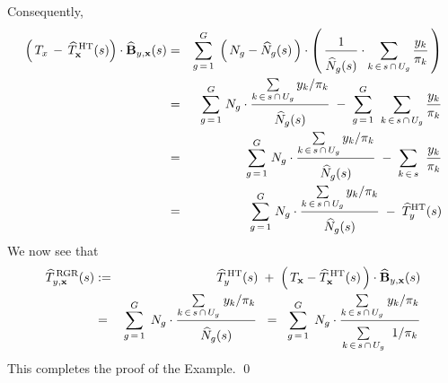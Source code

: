 Consequently,
\begin{eqnarray*}
\left(\,T_{x} \,-\, \widehat{T}^{\,\textnormal{HT}}_{\mathbf{x}}(s)\right)
\cdot
\widehat{\mathbf{B}}_{y,\mathbf{x}}(s)
& = &
	\overset{G}{\underset{g\,=\,1}{\sum}}\;
	\left(\,N_{g} - \widehat{N}_{g}(s) \,\right)
	\cdot
	\left(\,
		\dfrac{1}{\overset{{\color{white}.}}{\widehat{N}_{g}(s)}}
		\cdot
		\underset{k\,\in\,s\,\cap\,U_{g}}{\sum}\, \dfrac{y_{k}}{\pi_{k}}
	\,\right)
\\
& = &
	\overset{G}{\underset{g\,=\,1}{\sum}}\;
	N_{g} \cdot \dfrac{ \underset{k\,\in\,s\,\cap\,U_{g}}{\sum}\, y_{k}/\pi_{k} }{\overset{{\color{white}.}}{\widehat{N}_{g}(s)}}
	\; - \;
	\overset{G}{\underset{g\,=\,1}{\sum}}\;\;
	\underset{k\,\in\,s\,\cap\,U_{g}}{\sum}\, \dfrac{y_{k}}{\pi_{k}}
\\
& = &
	\overset{G}{\underset{g\,=\,1}{\sum}}\;
	N_{g} \cdot \dfrac{ \underset{k\,\in\,s\,\cap\,U_{g}}{\sum}\, y_{k}/\pi_{k} }{\overset{{\color{white}.}}{\widehat{N}_{g}(s)}}
	\; - \;
	\underset{k\,\in\,s}{\sum}\;\;\dfrac{y_{k}}{\pi_{k}}
\\
& = &
	\overset{G}{\underset{g\,=\,1}{\sum}}\;
	N_{g} \cdot \dfrac{ \underset{k\,\in\,s\,\cap\,U_{g}}{\sum}\, y_{k}/\pi_{k} }{\overset{{\color{white}.}}{\widehat{N}_{g}(s)}}
	\; - \;
	\widehat{T}^{\textnormal{HT}}_{y}(s)
\end{eqnarray*}
We now see that
\begin{eqnarray*}
\widehat{T}^{\,\textnormal{RGR}}_{y,\mathbf{x}}(s)
& := &
	\widehat{T}^{\,\textnormal{HT}}_{y}(s)
	\; + \;
	\left(\,T_{\mathbf{x}} - \widehat{T}^{\,\textnormal{HT}}_{\mathbf{x}}(s) \,\right)
	\cdot
	\widehat{\mathbf{B}}_{y,\mathbf{x}}(s)
\\
& = &
	\overset{G}{\underset{g\,=\,1}{\sum}}\;\, N_{g}
	\cdot
	\dfrac{
		\underset{k\,\in\,s\,\cap\,U_{g}}{\sum}\;y_{k}/\pi_{k}
		}{
		\overset{{\color{white}.}}{\widehat{N}_{g}(s)}
		}
\;\; = \;\;
	\overset{G}{\underset{g\,=\,1}{\sum}}\;\, N_{g}
	\cdot
	\dfrac{
		\underset{k\,\in\,s\,\cap\,U_{g}}{\sum}\;y_{k}/\pi_{k}
		}{
		\underset{k\,\in\,s\,\cap\,U_{g}}{\overset{{\color{white}.}}{\sum}}\;\;1/\pi_{k}
		}
\end{eqnarray*}
This completes the proof of the Example.
\qed


\renewcommand{\theenumi}{\roman{enumi}}
\renewcommand{\labelenumi}{\textnormal{(\theenumi)}$\;\;$}

